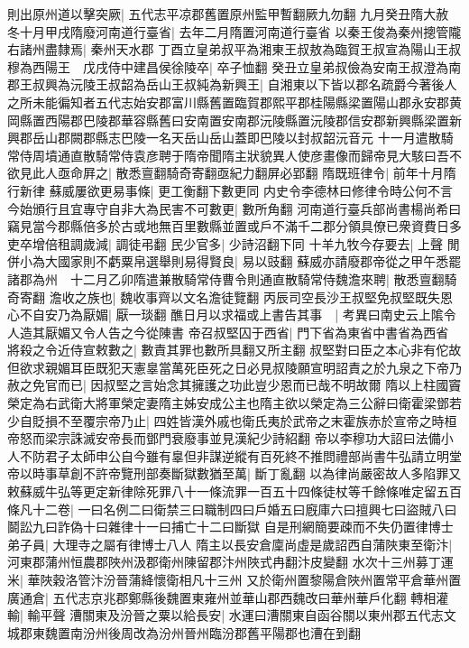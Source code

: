 則出原州道以擊突厥|{
	五代志平凉郡舊置原州監甲暫翻厥九勿翻}
九月癸丑隋大赦　冬十月甲戌隋廢河南道行臺省|{
	去年二月隋置河南道行臺省}
以秦王俊為秦州摠管隴右諸州盡隸焉|{
	秦州天水郡}
丁酉立皇弟叔平為湘東王叔敖為臨賀王叔宣為陽山王叔穆為西陽王　戊戌侍中建昌侯徐陵卒|{
	卒子恤翻}
癸丑立皇弟叔儉為安南王叔澄為南郡王叔興為沅陵王叔韶為岳山王叔純為新興王|{
	自湘東以下皆以郡名疏爵今著後人之所未能徧知者五代志始安郡富川縣舊置臨賀郡熙平郡桂陽縣梁置陽山郡永安郡黄岡縣置西陽郡巴陵郡華容縣舊曰安南置安南郡沅陵縣置沅陵郡信安郡新興縣梁置新興郡岳山郡闕郡縣志巴陵一名天岳山岳山蓋即巴陵以封叔韶沅音元}
十一月遣散騎常侍周墳通直散騎常侍袁彦聘于隋帝聞隋主狀貌異人使彦畫像而歸帝見大駭曰吾不欲見此人亟命屛之|{
	散悉亶翻騎奇寄翻亟紀力翻屏必郢翻}
隋既班律令|{
	前年十月隋行新律}
蘇威屢欲更易事條|{
	更工衡翻下數更同}
内史令李德林曰修律令時公何不言今始頒行且宜專守自非大為民害不可數更|{
	數所角翻}
河南道行臺兵部尚書楊尚希曰竊見當今郡縣倍多於古或地無百里數縣並置或戶不滿千二郡分領具僚已衆資費日多吏卒增倍租調歲減|{
	調徒弔翻}
民少官多|{
	少詩沼翻下同}
十羊九牧今存要去|{
	上聲}
閒併小為大國家則不虧粟帛選舉則易得賢良|{
	易以豉翻}
蘇威亦請廢郡帝從之甲午悉罷諸郡為州　十二月乙卯隋遣兼散騎常侍曹令則通直散騎常侍魏澹來聘|{
	散悉亶翻騎奇寄翻}
澹收之族也|{
	魏收事齊以文名澹徒覽翻}
丙辰司空長沙王叔堅免叔堅既失恩心不自安乃為厭媚|{
	厭一琰翻}
醮日月以求福或上書告其事　|{
	考異曰南史云上隂令人造其厭媚又令人告之今從陳書}
帝召叔堅囚于西省|{
	門下省為東省中書省為西省}
將殺之令近侍宣敕數之|{
	數責其罪也數所具翻又所主翻}
叔堅對曰臣之本心非有佗故但欲求親媚耳臣既犯天憲辠當萬死臣死之日必見叔陵願宣明詔責之於九泉之下帝乃赦之免官而已|{
	因叔堅之言始念其擁護之功此豈少恩而已哉不明故爾}
隋以上柱國竇榮定為右武衛大將軍榮定妻隋主姊安成公主也隋主欲以榮定為三公辭曰衛霍梁鄧若少自貶損不至覆宗帝乃止|{
	四姓皆漢外戚也衛氏夷於武帝之末霍族赤於宣帝之時桓帝怒而梁宗誅滅安帝長而鄧門衰廢事並見漢紀少詩紹翻}
帝以李穆功大詔曰法備小人不防君子太師申公自今雖有辠但非謀逆縱有百死終不推問禮部尚書牛弘請立明堂帝以時事草創不許帝覽刑部奏斷獄數猶至萬|{
	斷丁亂翻}
以為律尚嚴密故人多陷罪又敕蘇威牛弘等更定新律除死罪八十一條流罪一百五十四條徒杖等千餘條唯定留五百條凡十二卷|{
	一曰名例二曰衛禁三曰職制四曰戶婚五曰廐庫六曰擅興七曰盜賊八曰鬬訟九曰詐偽十曰雜律十一曰捕亡十二曰斷獄}
自是刑網簡要疎而不失仍置律博士弟子員|{
	大理寺之屬有律博士八人}
隋主以長安倉廩尚虛是歲詔西自蒲陜東至衛汴|{
	河東郡蒲州恒農郡陜州汲郡衛州陳留郡汴州陜式冉翻汴皮變翻}
水次十三州募丁運米|{
	華陜穀洛管汴汾晉蒲絳懷衛相凡十三州}
又於衛州置黎陽倉陜州置常平倉華州置廣通倉|{
	五代志京兆郡鄭縣後魏置東雍州並華山郡西魏改曰華州華戶化翻}
轉相灌輸|{
	輸平聲}
漕關東及汾晉之粟以給長安|{
	水運曰漕關東自函谷關以東州郡五代志文城郡東魏置南汾州後周改為汾州晉州臨汾郡舊平陽郡也漕在到翻}

